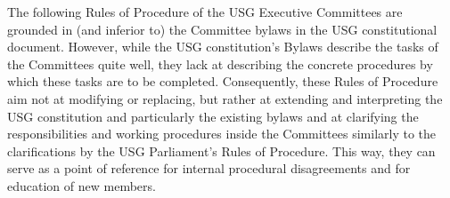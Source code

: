 The following Rules of Procedure of the USG Executive Committees are grounded in (and inferior to) the Committee bylaws in the USG constitutional document. However, while the USG constitution's Bylaws describe the tasks of the Committees quite well, they lack at describing the concrete procedures by which these tasks are to be completed. Consequently, these Rules of Procedure aim not at modifying or replacing, but rather at extending and interpreting the USG constitution and particularly the existing bylaws and at clarifying the responsibilities and working procedures inside the Committees similarly to the clarifications by the USG Parliament's Rules of Procedure. 
This way, they can serve as a point of reference for internal procedural disagreements and for education of new members.


